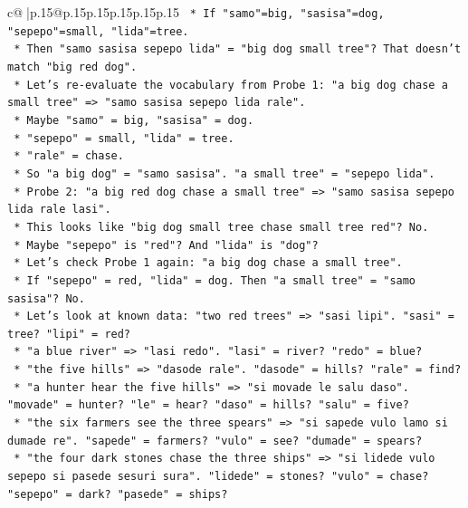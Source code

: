\documentclass{article}
\begin{document}
{\begin{supertabular}{c@{$\;$}|p{.15\linewidth}@{}p{.15\linewidth}p{.15\linewidth}p{.15\linewidth}p{.15\linewidth}p{.15\linewidth}}
{{{\texttt{        *   If "samo"=big, "sasisa"=dog, "sepepo"=small, "lida"=tree.} \\
\texttt{        *   Then "samo sasisa sepepo lida" = "big dog small tree"? That doesn't match "big red dog".} \\
\texttt{        *   Let's re{-}evaluate the vocabulary from Probe 1: "a big dog chase a small tree" => "samo sasisa sepepo lida rale".} \\
\texttt{            *   Maybe "samo" = big, "sasisa" = dog.} \\
\texttt{            *   "sepepo" = small, "lida" = tree.} \\
\texttt{            *   "rale" = chase.} \\
\texttt{            *   So "a big dog" = "samo sasisa". "a small tree" = "sepepo lida".} \\
\texttt{        *   Probe 2: "a big red dog chase a small tree" => "samo sasisa sepepo lida rale lasi".} \\
\texttt{            *   This looks like "big dog small tree chase small tree red"? No.} \\
\texttt{            *   Maybe "sepepo" is "red"? And "lida" is "dog"?} \\
\texttt{            *   Let's check Probe 1 again: "a big dog chase a small tree".} \\
\texttt{                *   If "sepepo" = red, "lida" = dog. Then "a small tree" = "samo sasisa"? No.} \\
\texttt{                *   Let's look at known data: "two red trees" => "sasi lipi". "sasi" = tree? "lipi" = red?} \\
\texttt{                *   "a blue river" => "lasi redo". "lasi" = river? "redo" = blue?} \\
\texttt{                *   "the five hills" => "dasode rale". "dasode" = hills? "rale" = find?} \\
\texttt{                *   "a hunter hear the five hills" => "si movade le salu daso". "movade" = hunter? "le" = hear? "daso" = hills? "salu" = five?} \\
\texttt{                *   "the six farmers see the three spears" => "si sapede vulo lamo si dumade re". "sapede" = farmers? "vulo" = see? "dumade" = spears?} \\
\texttt{                *   "the four dark stones chase the three ships" => "si lidede vulo sepepo si pasede sesuri sura". "lidede" = stones? "vulo" = chase? "sepepo" = dark? "pasede" = ships?} \\
}}}
\end{supertabular}}
\end{document}
